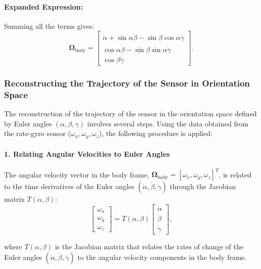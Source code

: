 \documentclass[12pt]{article}
\begin{document}
\paragraph{Expanded Expression:}
Summing all the terms gives:
\begin{equation}
\label{eq:omega_body_expanded}
\boldsymbol{\Omega}_{\text{body}} =
\begin{bmatrix}
\dot{\alpha} + \sin\alpha\dot{\beta} - \sin\beta\cos\alpha\dot{\gamma} \\
\cos\alpha\dot{\beta} - \sin\beta\sin\alpha\dot{\gamma} \\
\cos\beta\dot{\gamma}
\end{bmatrix}.
\end{equation}

\subsubsection{Reconstructing the Trajectory of the Sensor in Orientation Space}

The reconstruction of the trajectory of the sensor in the orientation space defined by Euler angles \((\alpha, \beta, \gamma)\) involves several steps. Using the data obtained from the rate-gyro sensor (\(\omega_x, \omega_y, \omega_z\)), the following procedure is applied:

\paragraph{1. Relating Angular Velocities to Euler Angles}

The angular velocity vector in the body frame, \(\boldsymbol{\Omega}_{\text{body}} = [\omega_x, \omega_y, \omega_z]^T\), is related to the time derivatives of the Euler angles \((\dot{\alpha}, \dot{\beta}, \dot{\gamma})\) through the Jacobian matrix \(T(\alpha, \beta)\):
\begin{equation}
\label{eq:jacobian_definition}
\begin{bmatrix}
\omega_x \\
\omega_y \\
\omega_z
\end{bmatrix}
=
T(\alpha, \beta)
\begin{bmatrix}
\dot{\alpha} \\
\dot{\beta} \\
\dot{\gamma}
\end{bmatrix},
\end{equation}

where \(T(\alpha, \beta)\) is the Jacobian matrix that relates the rates of change of the Euler angles \((\dot{\alpha}, \dot{\beta}, \dot{\gamma})\) to the angular velocity components in the body frame.
\end{document}
